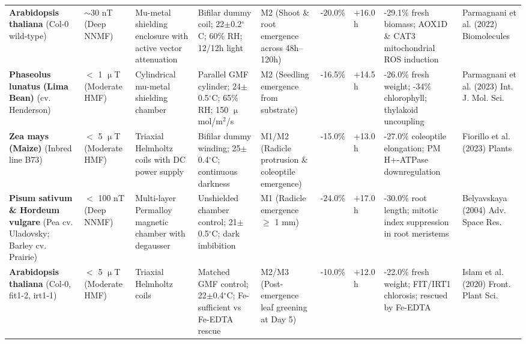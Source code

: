 \begin{table}[t]
\begin{tabular*}{\textwidth}{@{\extracolsep\fill}p{2.2cm}p{1.6cm}p{1.6cm}p{2.3cm}p{1.6cm}p{1.1cm}p{1.1cm}p{2.2cm}p{2.4cm}@{}}
\raggedright\scriptsize \textbf{Arabidopsis thaliana} (Col-0 wild-type) & \raggedright\scriptsize $\sim$30 nT (Deep NNMF) & \raggedright\scriptsize Mu-metal shielding enclosure with active vector attenuation & \raggedright\scriptsize Bifilar dummy coil; 22$\pm$0.2$^\circ$C; 60\% RH; 12/12h light & \raggedright\scriptsize M2 (Shoot \& root emergence across 48h--120h) & \raggedright\scriptsize -20.0\% & \raggedright\scriptsize +16.0 h & \raggedright\scriptsize -29.1\% fresh biomass; AOX1D \& CAT3 mitochondrial ROS induction & \raggedright\scriptsize Parmagnani et al. (2022) Biomolecules \\
\raggedright\scriptsize \textbf{Phaseolus lunatus (Lima Bean)} (cv. Henderson) & \raggedright\scriptsize $<$ 1 $\upmu$T (Moderate HMF) & \raggedright\scriptsize Cylindrical mu-metal shielding chamber & \raggedright\scriptsize Parallel GMF cylinder; 24$\pm$0.5$^\circ$C; 65\% RH; 150 $\upmu$mol/m$^2$/s & \raggedright\scriptsize M2 (Seedling emergence from substrate) & \raggedright\scriptsize -16.5\% & \raggedright\scriptsize +14.5 h & \raggedright\scriptsize -26.0\% fresh weight; -34\% chlorophyll; thylakoid uncoupling & \raggedright\scriptsize Parmagnani et al. (2023) Int. J. Mol. Sci. \\
\raggedright\scriptsize \textbf{Zea mays (Maize)} (Inbred line B73) & \raggedright\scriptsize $<$ 5 $\upmu$T (Moderate HMF) & \raggedright\scriptsize Triaxial Helmholtz coils with DC power supply & \raggedright\scriptsize Bifilar dummy winding; 25$\pm$0.4$^\circ$C; continuous darkness & \raggedright\scriptsize M1/M2 (Radicle protrusion \& coleoptile emergence) & \raggedright\scriptsize -15.0\% & \raggedright\scriptsize +13.0 h & \raggedright\scriptsize -27.0\% coleoptile elongation; PM H+-ATPase downregulation & \raggedright\scriptsize Fiorillo et al. (2023) Plants \\
\raggedright\scriptsize \textbf{Pisum sativum \& Hordeum vulgare} (Pea cv. Uladovsky; Barley cv. Prairie) & \raggedright\scriptsize $<$ 100 nT (Deep NNMF) & \raggedright\scriptsize Multi-layer Permalloy magnetic chamber with degausser & \raggedright\scriptsize Unshielded chamber control; 21$\pm$0.5$^\circ$C; dark imbibition & \raggedright\scriptsize M1 (Radicle emergence $\ge$ 1 mm) & \raggedright\scriptsize -24.0\% & \raggedright\scriptsize +17.0 h & \raggedright\scriptsize -30.0\% root length; mitotic index suppression in root meristems & \raggedright\scriptsize Belyavskaya (2004) Adv. Space Res. \\
\raggedright\scriptsize \textbf{Arabidopsis thaliana} (Col-0, fit1-2, irt1-1) & \raggedright\scriptsize $<$ 5 $\upmu$T (Moderate HMF) & \raggedright\scriptsize Triaxial Helmholtz coils & \raggedright\scriptsize Matched GMF control; 22$\pm$0.4$^\circ$C; Fe-sufficient vs Fe-EDTA rescue & \raggedright\scriptsize M2/M3 (Post-emergence leaf greening at Day 5) & \raggedright\scriptsize -10.0\% & \raggedright\scriptsize +12.0 h & \raggedright\scriptsize -22.0\% fresh weight; FIT/IRT1 chlorosis; rescued by Fe-EDTA & \raggedright\scriptsize Islam et al. (2020) Front. Plant Sci. \\

\end{tabular*}
\end{table}
